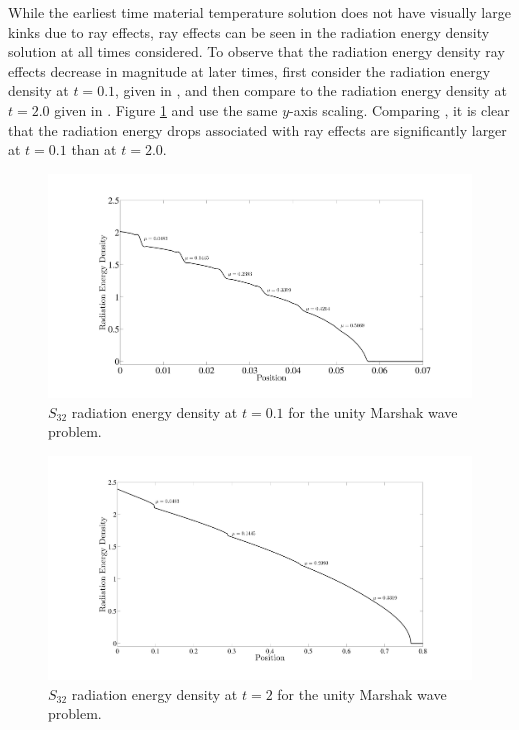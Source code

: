 While the earliest time material temperature solution does not have visually large kinks due to ray effects, ray effects can be seen in the radiation energy density solution at all times considered.
To observe that the radiation energy density ray effects decrease in magnitude at later times, first consider the radiation energy density at $t=0.1$, given in , and then compare to the radiation energy density at $t=2.0$ given in .  
Figure \ref{fig:t01_radiation_energy} and  use the same $y$-axis scaling.  
Comparing , it is clear that the radiation energy drops associated with ray effects are significantly larger at $t=0.1$ than at $t=2.0$.
\begin{figure}[!htp]
\centering
\includegraphics[width=16cm,trim=2in  0.5in 0.5in 0.75in,clip=true]{chapter6_grey_radtran/Dissertation_Data/S32_T01_Radiation_Equal_Height.pdf}
\caption{$S_{32}$ radiation energy density at $t=0.1$ for the unity Marshak wave problem.}
\label{fig:t01_radiation_energy}
\end{figure}
\begin{figure}[!hbp]
\centering
\includegraphics[width=16cm,trim=2in  0.4in 0.5in 0.75in,clip=true]{chapter6_grey_radtran/Dissertation_Data/S32_T2_Radiation.pdf}
\caption{$S_{32}$ radiation energy density at $t=2$ for the unity Marshak wave problem.}
\label{fig:t2_radiation_energy}
\end{figure}
